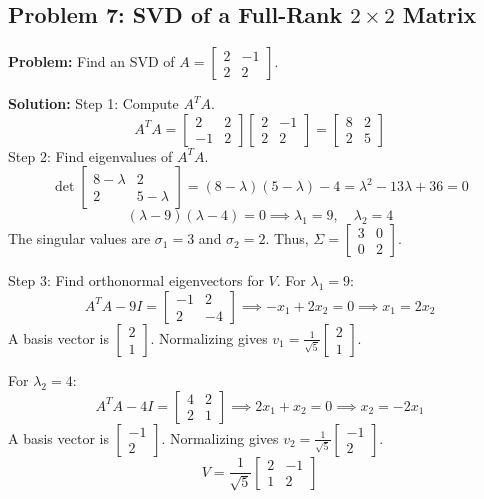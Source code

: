 \documentclass[11pt, letterpaper]{article}
\theoremstyle{definition}
\theoremstyle{remark}
\begin{document}
\vspace{1em}
\subsection{Problem 7: SVD of a Full-Rank $2 \times 2$ Matrix}
\textbf{Problem:} Find an SVD of $A = \begin{bmatrix} 2 & -1 \\ 2 & 2 \end{bmatrix}$.

\textbf{Solution:}
Step 1: Compute $A^TA$.
\[
A^TA = \begin{bmatrix} 2 & 2 \\ -1 & 2 \end{bmatrix} \begin{bmatrix} 2 & -1 \\ 2 & 2 \end{bmatrix} = \begin{bmatrix} 8 & 2 \\ 2 & 5 \end{bmatrix}
\]
Step 2: Find eigenvalues of $A^TA$.
\[
\det \begin{bmatrix} 8 - \lambda & 2 \\ 2 & 5 - \lambda \end{bmatrix} = (8 - \lambda)(5 - \lambda) - 4 = \lambda^2 - 13\lambda + 36 = 0
\]
\[
(\lambda - 9)(\lambda - 4) = 0 \implies \lambda_1 = 9, \quad \lambda_2 = 4
\]
The singular values are $\sigma_1 = 3$ and $\sigma_2 = 2$. Thus, $\Sigma = \begin{bmatrix} 3 & 0 \\ 0 & 2 \end{bmatrix}$.

Step 3: Find orthonormal eigenvectors for $V$.
For $\lambda_1 = 9$:
\[
A^TA - 9I = \begin{bmatrix} -1 & 2 \\ 2 & -4 \end{bmatrix} \implies -x_1 + 2x_2 = 0 \implies x_1 = 2x_2
\]
A basis vector is $\begin{bmatrix} 2 \\ 1 \end{bmatrix}$. Normalizing gives $v_1 = \frac{1}{\sqrt{5}}\begin{bmatrix} 2 \\ 1 \end{bmatrix}$.

For $\lambda_2 = 4$:
\[
A^TA - 4I = \begin{bmatrix} 4 & 2 \\ 2 & 1 \end{bmatrix} \implies 2x_1 + x_2 = 0 \implies x_2 = -2x_1
\]
A basis vector is $\begin{bmatrix} -1 \\ 2 \end{bmatrix}$. Normalizing gives $v_2 = \frac{1}{\sqrt{5}}\begin{bmatrix} -1 \\ 2 \end{bmatrix}$.
\[
V = \frac{1}{\sqrt{5}} \begin{bmatrix} 2 & -1 \\ 1 & 2 \end{bmatrix}
\]
\end{document}
